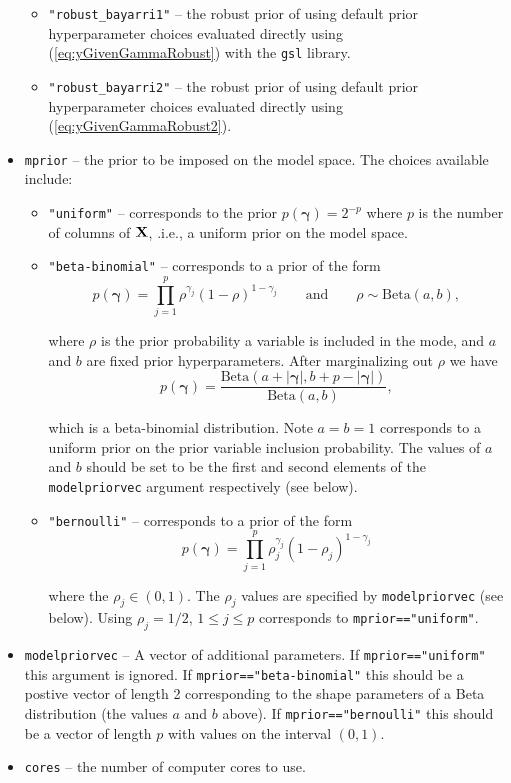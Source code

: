 \documentclass[12pt]{article}
\def\vectorfonttwo{\boldsymbol}
\def\vgamma{{\vectorfonttwo \gamma}}             %
\def\matrixfontone{\bf}
\def\mX{{\matrixfontone X}}                      %
\def\ds{\displaystyle}
\begin{document}
\begin{itemize}
\begin{itemize}
		\item {\tt "robust\_bayarri1"} -- the robust prior of \cite{Bayarri2012}
		using default prior hyperparameter choices evaluated directly using 
		(\ref{eq:yGivenGammaRobust}) with the {\tt gsl} library.
		
		\item {\tt "robust\_bayarri2"} -- the robust prior of \cite{Bayarri2012}
		using default prior hyperparameter choices evaluated directly using
		(\ref{eq:yGivenGammaRobust2}).
	
	\end{itemize}
    \item {\tt mprior} -- the prior to be imposed on the model space. The choices available include:
    \begin{itemize}
    	\item {\tt "uniform"} -- corresponds to the prior $p(\vgamma) = 2^{-p}$ where $p$ is the number of columns of $\mX$, .i.e.,
    	a uniform prior on the model space.
    	
    	\item {\tt "beta-binomial"} -- corresponds to a prior of the form
    	$$
    	\ds p(\vgamma) = \prod_{j=1}^p \rho^{\gamma_j} (1 - \rho)^{1 - \gamma_j} \qquad \mbox{and} \qquad \rho \sim \mbox{Beta}(a,b),
    	$$
    	
    	\noindent where $\rho$ is the prior probability a variable is included in the mode, and $a$ and $b$ are fixed prior hyperparameters. After marginalizing out $\rho$ we have
    	$$
    	p(\vgamma) = \frac{\mbox{Beta}(a + |\vgamma|,b + p - |\vgamma|)}{\mbox{Beta}(a,b)},
    	$$
    	
    	\noindent which is a beta-binomial distribution. Note $a=b=1$ corresponds to a uniform prior on the prior
    	variable inclusion probability. The values of $a$ and $b$ should be set to be the
    	first and second elements of the {\tt modelpriorvec} argument respectively (see below).
    	
    	\item {\tt "bernoulli"} -- corresponds to a prior of the form 
    	$$
    	p(\vgamma) = \prod_{j=1}^p \rho_j^{\gamma_j} (1 - \rho_j)^{1 - \gamma_j}
    	$$
    	
    	\noindent where the $\rho_j\in(0,1)$. The $\rho_j$ values are specified by
    	{\tt modelpriorvec} (see below). Using $\rho_j = 1/2$, $1\le j\le p$ corresponds to 
    	{\tt mprior=="uniform"}.
	\end{itemize}

	\item {\tt modelpriorvec} -- A vector of additional parameters. If {\tt mprior=="uniform"} this argument is ignored.
	If {\tt mprior=="beta-binomial"} this should be a postive vector of length 2 corresponding to the shape parameters
	of a Beta distribution (the values $a$ and $b$ above). If {\tt mprior=="bernoulli"} this should be a vector of length $p$ 
	with values on the interval $(0,1)$.
	
	\item {\tt cores} -- the number of computer cores to use.
\end{itemize}
\end{document}
